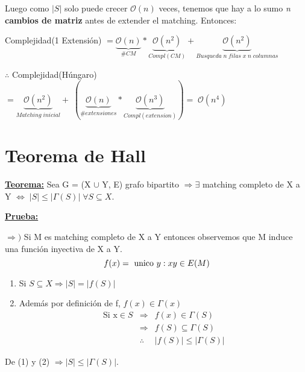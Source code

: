 \documentclass[12pt,a4paper]{report}
\begin{document}
\begin{enumerate}
					\par Luego como $\lvert S \rvert$ solo puede crecer $\mathcal{O}(n)$ veces, tenemos que hay a lo sumo \textit{n} \textbf{cambios de matriz} antes de extender el matching. Entonces:
						\begin{center}
							\par Complejidad(1 Extensión) $= \underbrace{\mathcal{O}(n)}_{\# CM} * \underbrace{\mathcal{O}(n^{2})}_{Compl(CM)} + \underbrace{\mathcal{O}(n^{2})}_{Busqueda \; \textit{n} \; filas \; x \; \textit{n} \; columnas }$ \\

							\vspace{5mm}
							\par $\therefore$ Complejidad(Húngaro) $= \underbrace{\mathcal{O}(n^{2})}_{Matching \; inicial} + \; (\underbrace{\mathcal{O}(n)}_{\#extensiones} * \underbrace{\mathcal{O}(n^{3})}_{Compl(extension)}) = \; \mathcal{O}(n^{4})$
						\end{center}
			\end{enumerate}


	\section{Teorema de Hall}
		\textbf{\underline{Teorema:}} Sea G = (X $\cup$ Y, E) grafo bipartito $\Rightarrow \exists$ matching completo de X a Y $\Leftrightarrow \; \lvert S \rvert \leq \lvert \Gamma(S) \rvert \; \forall S \subseteq X$.

		\vspace{3mm}
		\textbf{\underline{Prueba:}}
			\par $\Rightarrow)$ Si M es matching completo de X a Y entonces observemos que M induce una función inyectiva de X a Y.
			\[ f(x) = \textup{ unico } y : xy \in E(M) \]

			\begin{enumerate}
				\item Si $S \subseteq X \Rightarrow \lvert S \rvert = \lvert f(S) \rvert$
				\item Además por definición de f, $f(x) \in \Gamma(x)$
					\begin{eqnarray}
						\nonumber \text{Si x} \in S &\Rightarrow & f(x) \in \Gamma(S) \\
						\nonumber &\Rightarrow & f(S) \subseteq \Gamma(S) \\
						\nonumber &\therefore & \lvert f(S) \rvert \leq \lvert \Gamma(S) \rvert
					\end{eqnarray}
			\end{enumerate}
			\par De (1) y (2) $\Rightarrow \lvert S \rvert \leq \lvert \Gamma(S) \rvert$.
\end{document}

